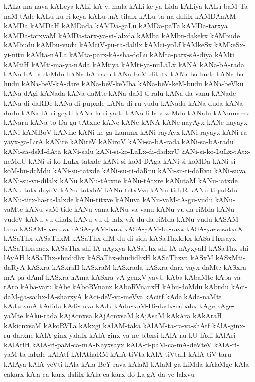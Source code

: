 {kALa-ma-nava
kALeya
kALi-kA-vi-mala
kALi-ke-ya-Lida
kALiya
kALu-baM-Ta-naM-tAde
kALu-ku-ri-keya
kALu-mA-tilalx
kALu-ta-na-dalilx
kAMDAnAM
kAMDa
kAMDaH
kAMDada
kAMDa-gaLu
kAMDa-paTa
kAMDa-tarxya
kAMDa-tarxyaM
kAMDa-tarx-ya-vi-lalxda
kAMba
kAMbu-dakekx
kAMbude
kAMbudu
kAMbu-vudu
kAMciV-pu-ra-dalilx
kAMci-yoLf
kAMkeSx
kAMkeSx-yi-nitu
kAMta-nALa
kAMta-parx-kA-sha-doLu
kAMta-parx-sA-diya
kAMti
kAMtiH
kAMti-ma-ya-nAda
kAMtiya
kAMti-ya-nuLaLx
kANA
kANa-bA-rada
kANa-bA-ra-deMdu
kANa-bA-radu
kANa-baM-ditutx
kANa-ba-hude
kANa-ba-hudu
kANa-beV-kA-dare
kANa-beV-keMba
kANa-beV-keM-budu
kANa-beVku
kANa-dAgi
kANada
kANa-daMte
kANa-daM-ti-ralu
kANa-da-vanu
kANade
kANa-di-daRDe
kANa-di-pupxde
kANa-di-ru-vudu
kANadu
kANa-duda
kANa-dudu
kANa-lA-ri-geyU
kANa-la-ri-yade
kANa-li-lalx-veMdu
kANalu
kANamamx
kANaru
kANa-to-Da-gu-tAtxne
kANe
kANe-kANA
kANe-nayAyx
kANe-nayayx
kANi
kANiBoV
kANike
kANi-ke-ga-Lanunx
kANi-rayAyx
kANi-rayayx
kANi-ra-yayx-ga-LirA
kANire
kANireV
kANiroV
kANi-sa-bA-rada
kANi-sa-bA-radu
kANi-sa-deM-dAta
kANi-salu
kANi-si-ko-LaLx-di-dadxrU
kANi-si-ko-LuLx-tAtx-neMdU
kANi-si-ko-LuLx-tatxde
kANi-si-koM-DAga
kANi-si-koMDa
kANi-si-koM-bu-doMdu
kANi-su-tatxde
kANi-su-ti-daRnu
kANi-su-ti-daRvu
kANi-suva
kANi-su-vu-dilalx
kANu
kANu-tAtxne
kANu-tAtxre
kANutaM
kANu-tatxde
kANu-tatx-deyoV
kANu-tatxleV
kANu-tetxVve
kANu-tiduR
kANu-ti-puRdu
kANu-titx-ha-ra-lalxde
kANu-titxve
kANuva
kANu-vaM-tA-gu-vudu
kANu-vaMte
kANu-vaM-tide
kANu-vana
kANu-va-vanu
kANu-vu-da-riMda
kANu-vudeV
kANu-vu-dilalx
kANu-vu-di-lalx-vA-du-da-riMda
kANu-vudu
kASAM-bara
kASAM-ba-rava
kASA-yAM-bara
kASA-yAM-ba-rava
kASA-ya-vasatxrX
kASaThx
kASaThxM
kASaThx-diM-du-di-sida
kASaThxkekx
kASaThxsayx
kASaThxshacx
kASaThx-shi-lA-nAyxya
kASaThx-shi-lA-nAyxyaH
kASaThx-shi-lAyAH
kASaThx-shudidhx
kASaThx-shudidhxH
kASaThxva
kASxM
kASxMti-daRyA
kASxra
kASxraH
kASxraM
kASxrada
kASxra-darx-vayx-daMte
kASxra-mA-pa-dAmf
kASxra-nAma
kASxra-vA-genxV-yavU
kAba
kAbaMte
kAba-va-rAro
kAba-varu
kAbe
kAboRVnanx
kAboRVnanxH
kAbu-doMdu
kAbudu
kAci-daM-ga-sathx-lA-sharxyA
kAci-deV-va-meVva
kAcitf
kAda
kAda-naMte
kAdarxmA
kAdida
kAdi-ruva
kAdu
kAdu-koM-Di-dadx-nobabx
kAge
kAge-yaMte
kAhu-rada
kAjAcnxsa
kAjAcnxsaM
kAjAsaM
kAkAra
kAkAraH
kAkicnxsaM
kAkoRVLa
kAkxgi
kAlAM-taka
kAlAM-ta-ra-va-shAtf
kAlA-ginx-ru-darxne
kAlA-ginx-yalalx
kAlA-ginx-ya-ne-bibxsi
kAlA-nu-kU-lAdi
kAlAri
kAlAriH
kAlA-ri-paM-ca-mA-Kayxsayx
kAlA-ri-paM-ca-mA-deVteV
kAlA-ri-yaM-ta-lalxde
kAlAtf
kAlAthaRM
kAlA-tiVta
kAlA-tiVtaH
kAlA-tiV-taru
kAlAya
kAlA-yeVti
kAla
kAla-BeY-rava
kAlaM
kAlaM-ga-LiMda
kAlaMge
kAla-cakarx
kAla-ca-karx-dalilx
kAla-ca-karx-do-La-gA-da-ve-lalxvu
}

